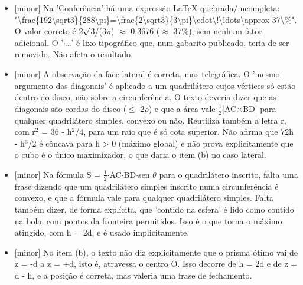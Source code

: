 \documentclass{article}%
\begin{document}
\begin{itemize}%
\item%
{[}minor{]} Na 'Conferência' há uma expressão LaTeX quebrada/incompleta: "\textbackslash{}frac\{192\textbackslash{}sqrt3\}\{288\textbackslash{}pi\}=\textbackslash{}frac\{2\textbackslash{}sqrt3\}\{3\textbackslash{}pi\}\textbackslash{}cdot\textbackslash{}!\textbackslash{}ldots\textbackslash{}approx 37\textbackslash{}\%". O valor correto é 2$\surd$3/(3$\pi$) $\approx$ 0,3676 ($\approx$ 37\%), sem nenhum fator adicional. O '$\cdot$\ldots{}' é lixo tipográfico que, num gabarito publicado, teria de ser removido. Não afeta o resultado.%
\item%
{[}minor{]} A observação da face lateral é correta, mas telegráfica. O 'mesmo argumento das diagonais' é aplicado a um quadrilátero cujos vértices só estão dentro do disco, não sobre a circunferência. O texto deveria dizer que as diagonais são cordas do disco ($\leq$ 2$\rho$) e que a área vale $\frac12$|AC$\times$BD| para qualquer quadrilátero simples, convexo ou não. Reutiliza também a letra r, com r$^2$ = 36 - h$^2$/4, para um raio que é só cota superior. Não afirma que 72h - h$^3$/2 é côncava para h > 0 (máximo global) e não prova explicitamente que o cubo é o único maximizador, o que daria o item (b) no caso lateral.%
\item%
{[}minor{]} Na fórmula S = $\frac12$$\cdot$AC$\cdot$BD$\cdot$sen $\theta$ para o quadrilátero inscrito, falta uma frase dizendo que um quadrilátero simples inscrito numa circunferência é convexo, e que a fórmula vale para qualquer quadrilátero simples. Falta também dizer, de forma explícita, que 'contido na esfera' é lido como contido na bola, com pontos da fronteira permitidos. Isso é o que torna o máximo atingido, com h = 2d, e é usado implicitamente.%
\item%
{[}minor{]} No item (b), o texto não diz explicitamente que o prisma ótimo vai de z = -d a z = +d, isto é, atravessa o centro O. Isso decorre de h = 2d e de z = d - h, e a posição é correta, mas valeria uma frase de fechamento.%
\end{itemize}%
\end{document}
